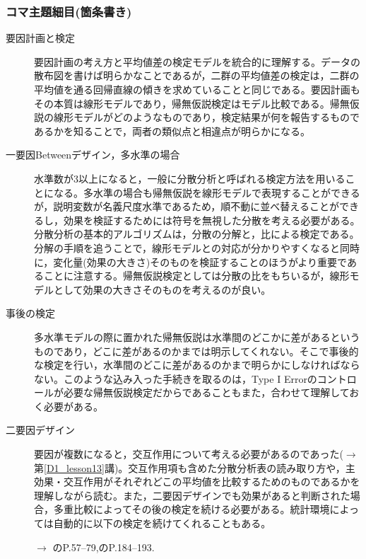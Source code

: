 \subsubsection{コマ主題細目(箇条書き)}
\begin{description}

\item[要因計画と検定]要因計画の考え方と平均値差の検定モデルを統合的に理解する。データの散布図を書けば明らかなことであるが，二群の平均値差の検定は，二群の平均値を通る回帰直線の傾きを求めていることと同じである。要因計画もその本質は線形モデルであり，帰無仮説検定はモデル比較である。帰無仮説の線形モデルがどのようなものであり，検定結果が何を報告するものであるかを知ることで，両者の類似点と相違点が明らかになる。

\item[一要因Betweenデザイン，多水準の場合]水準数が3以上になると，一般に分散分析と呼ばれる検定方法を用いることになる。多水準の場合も帰無仮説を線形モデルで表現することができるが，説明変数が名義尺度水準であるため，順不動に並べ替えることができるし，効果を検証するためには符号を無視した分散を考える必要がある。分散分析の基本的アルゴリズムは，分散の分解と，比による検定である。分解の手順を追うことで，線形モデルとの対応が分かりやすくなると同時に，変化量(効果の大きさ)そのものを検証することのほうがより重要であることに注意する。帰無仮説検定としては分散の比をもちいるが，線形モデルとして効果の大きさそのものを考えるのが良い。 

\item[事後の検定]多水準モデルの際に置かれた帰無仮説は水準間のどこかに差があるというものであり，どこに差があるのかまでは明示してくれない。そこで事後的な検定を行い，水準間のどこに差があるのかまで明らかにしなければならない。このような込み入った手続きを取るのは，Type I Errorのコントロールが必要な帰無仮説検定だからであることもまた，合わせて理解しておく必要がある。


\item[二要因デザイン]要因が複数になると，交互作用について考える必要があるのであった($\to$第\ref{D1_lesson13}講)。交互作用項も含めた分散分析表の読み取り方や，主効果・交互作用がそれぞれどこの平均値を比較するためのものであるかを理解しながら読む。また，二要因デザインでも効果があると判断された場合，多重比較によってその後の検定を続ける必要がある。統計環境によっては自動的に以下の検定を続けてくれることもある。
\begin{flushright}
    $\to$ \citet{橋本201607} のP.57--79,\citet{Yamada2004}のP.184--193.
\end{flushright}

\end{description}
